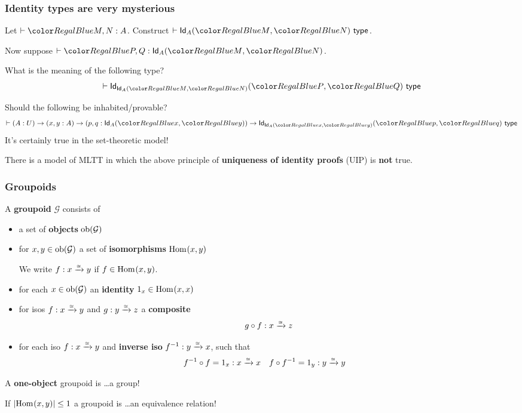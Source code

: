 \documentclass[handout]{beamer} %
\begin{document}
\begin{frame}
  \frametitle{Identity types are very mysterious}
  Let $\IsTm[]{M, N}{A}$. Construct $\IsTy[]{\Id{A}{M}{N}}[]$.

  \medskip

  Now suppose $\IsTm[]{P, Q}{\Id{A}{M}{N}}$.

  \medskip

  What is the meaning of the following type?
  \[
    \IsTy[]{\Id{\Id{A}{M}{N}}{P}{Q}}[]
  \]

  Should the following be inhabited/provable?
  \[
    \IsTy[]{
      \Fn{A}{U}{
        \Fn{x, y}{A}{
          \Fn{p, q}{\Id{A}{x}{y}}{
            \Id{\Id{A}{x}{y}}{p}{q}
          }
        }
      }
    }[]
  \]
  It's certainly true in the set-theoretic model!
  \begin{theorem}
    There is a model of MLTT in which the above principle of \textbf{uniqueness of identity proofs} (UIP) is \textbf{not} true.
  \end{theorem}
\end{frame}

\begin{frame}
  \frametitle{Groupoids}
  
  \begin{definition}
    A \textbf{groupoid} $\mathcal{G}$ consists of
    \begin{itemize}
      \item a set of \textbf{objects} $\mathrm{ob}(\mathcal{G})$
      \item for $x, y \in \mathrm{ob}(\mathcal{G})$ a set of \textbf{isomorphisms} $\Hom{x}{y}$
        
      We write $f : x \xrightarrow{\tiny \cong} y$ if $f \in \Hom{x}{y}$.
      \item for each $x \in \mathrm{ob}(\mathcal{G})$ an \textbf{identity} $1_x \in \Hom{x}{x}$
      \item for isos $f : x \xrightarrow{\tiny \cong} y$ and $g : y \xrightarrow{\tiny \cong} z$ a \textbf{composite}
      \[
        g \circ f : x \xrightarrow{\tiny \cong} z
      \]
      \item for each iso $f : x \xrightarrow{\tiny \cong} y$ and \textbf{inverse iso} $f^{-1} : y \xrightarrow{\tiny \cong} x$,
      such that
      \begin{align*}
        f^{-1} \circ f &= 1_x : x \xrightarrow{\tiny \cong} x &
        f \circ f^{-1} &= 1_y : y \xrightarrow{\tiny \cong} y
      \end{align*}
    \end{itemize}
  \end{definition}
  
  A \textbf{one-object} groupoid is \dots \pause a group!

  \smallskip
  
  If $\lvert \Hom{x}{y} \rvert \leq 1$ a groupoid is \dots  \pause an equivalence
  relation!
\end{frame}
\end{document}
